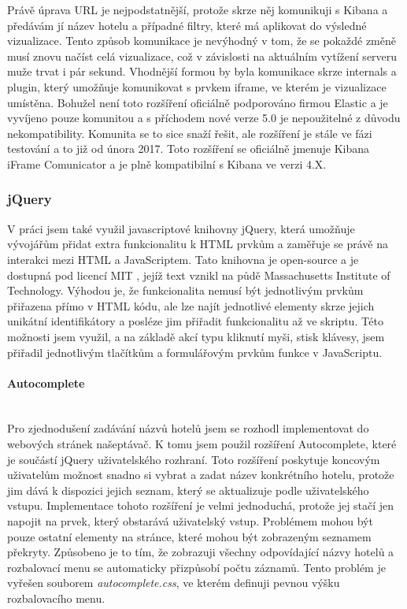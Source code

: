 \documentclass[czech,BP]{thesiskiv}
\begin{document}
Právě úprava URL je nejpodstatnější, protože skrze něj komunikuji s Kibana a předávám jí název hotelu a případné filtry, které má aplikovat do výsledné vizualizace. Tento způsob komunikace je nevýhodný v tom, že se pokaždé změně musí znovu načíst celá vizualizace, což v závislosti na aktuálním vytížení serveru muže trvat i pár sekund. Vhodnější formou by byla komunikace skrze internals a plugin, který umožňuje komunikovat s prvkem iframe, ve kterém je vizualizace umístěna. Bohužel není toto rozšíření oficiálně podporováno firmou Elastic a je vyvíjeno pouze komunitou a s příchodem nové verze 5.0 je nepoužitelné z důvodu nekompatibility. Komunita se to sice snaží řešit, ale rozšíření je stále ve fázi testování a to již od února 2017. Toto rozšíření se oficiálně jmenuje Kibana iFrame Comunicator a je plně kompatibilní s Kibana ve verzi 4.X.

\subsubsection{jQuery}
V práci jsem také využil javascriptové knihovny jQuery, která umožňuje vývojářům přidat extra funkcionalitu k HTML prvkům a zaměřuje se právě na interakci mezi HTML a JavaScriptem. Tato knihovna je open-source a je dostupná pod licencí MIT\cite{jQuery} , jejíž text vznikl na půdě Massachusetts  Institute of Technology.\cite{MIT_licence} Výhodou je, že funkcionalita nemusí být jednotlivým prvkům přiřazena přímo v HTML kódu, ale lze najít jednotlivé elementy skrze jejich unikátní identifikátory a posléze jim přiřadit funkcionalitu až ve skriptu. Této možnosti jsem využil, a na základě akcí typu kliknutí myši, stisk klávesy, jsem přiřadil jednotlivým tlačítkům a formulářovým prvkům funkce v JavaScriptu.

\paragraph{Autocomplete}
\mbox{}\\
Pro zjednodušení zadávání názvů hotelů jsem se rozhodl implementovat do webových stránek našeptávač. K tomu jsem použil rozšíření Autocomplete, které je součástí jQuery uživatelského rozhraní. Toto rozšíření poskytuje koncovým uživatelům možnost snadno si vybrat a zadat název konkrétního hotelu, protože jim dává k dispozici jejich seznam, který se aktualizuje podle uživatelského vstupu. Implementace tohoto rozšíření je velmi jednoduchá, protože jej stačí jen napojit na prvek, který obstarává uživatelský vstup. Problémem mohou být pouze ostatní elementy na stránce, které mohou být zobrazeným seznamem překryty. Způsobeno je to tím, že zobrazuji všechny odpovídající názvy hotelů a rozbalovací menu se automaticky přizpůsobí počtu záznamů. Tento problém je vyřešen souborem \textit{autocomplete.css}, ve kterém definuji pevnou výšku rozbalovacího menu.
\end{document}
